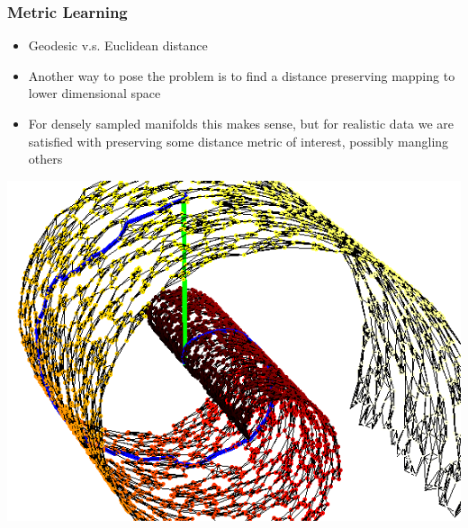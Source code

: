 \documentclass{beamer}
\begin{document}
\begin{frame}
\frametitle{Metric Learning}  
\begin{itemize}
\item{Geodesic v.s. Euclidean distance}
\item{Another way to pose the problem is to find a distance preserving mapping to lower dimensional space} 
\item{For densely sampled manifolds this makes sense, but for realistic data we are satisfied with preserving some distance metric of interest, possibly mangling others}  
\end{itemize} 
\begin{center} 
\includegraphics[scale = 0.3]{swiss.png} 
\end{center} 
\end{frame}
\end{document}
